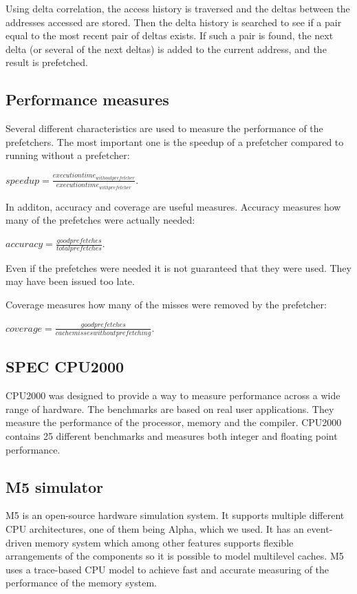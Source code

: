 Using delta correlation, the access history is traversed and the
deltas between the addresses accessed are stored. Then the delta
history is searched to see if a pair equal to the most recent pair
of deltas exists. If such a pair is found, the next delta (or
several of the next deltas) is added to the current address,
and the result is prefetched.

\subsection{Performance measures}
Several different characteristics are used to measure the performance
of the prefetchers. The most important one is the speedup of a
prefetcher compared to running without a prefetcher:

$speedup = \frac{execution time_{without prefetcher}}{execution time_{with prefetcher}}$.

In additon, accuracy and coverage are useful measures. Accuracy measures
how many of the prefetches were actually needed:

$accuracy = \frac{good prefetches}{total prefetches}$.

Even if the prefetches were needed it is not guaranteed that they
were used. They may have been issued too late.

Coverage measures how many of the misses were removed by the
prefetcher:

$coverage = \frac{good prefetches}{cache misses without prefetching}$.

\cite{bib:doc}

\subsection{SPEC CPU2000}
CPU2000 was designed to provide a way to measure performance across
a wide range of hardware. The benchmarks are based on real user
applications. They measure the performance of the processor, memory
and the compiler. CPU2000 contains 25 different benchmarks and
measures both integer and floating point performance.

\cite{bib:cpu2000}

\subsection{M5 simulator}
M5 is an open-source hardware simulation system. It supports multiple
different CPU architectures, one of them being Alpha, which we used.
It has an event-driven memory system which among other features supports
flexible arrangements of the components so it is possible to model
multilevel caches. M5 uses a trace-based CPU model to achieve fast and
accurate measuring of the performance of the memory system.

\cite{bib:m5}

